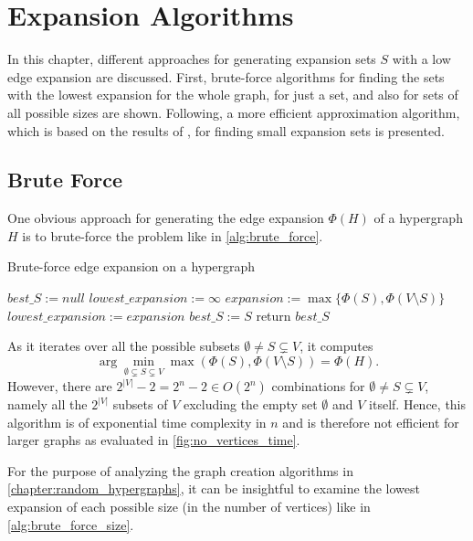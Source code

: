 \chapter{Expansion Algorithms}\label{chapter:algorithms}
In this chapter, different approaches for generating expansion sets $S$ with a low edge expansion are discussed. First, brute-force algorithms for finding the sets with the lowest expansion for the whole graph, %
for just a set,  %
and also for sets of all possible sizes  %
are shown. Following, a more efficient approximation algorithm, which is based on the results of \cite{ChanLTZ16}, for finding small expansion sets is presented.
\section{Brute Force}
One obvious approach for generating the edge expansion $\Phi(H)$ of a hypergraph $H$ is to brute-force the problem like in \cref{alg:brute_force}.
\begin{algorithm}[H]
	\caption{Brute-force edge expansion on a hypergraph \label{alg:brute_force}}
	\begin{algorithmic}
		\State $best\_S := null$
		\State $lowest\_expansion := \infty$
		\State $expansion :=  \max\{ \Phi(S), \Phi({V\setminus S})\}$
			\State $lowest\_expansion := expansion$
			\State $best\_S := S$
		\EndIf
		\EndFor	
		\State return $best\_S$
		\EndFunction
	\end{algorithmic}
\end{algorithm}
As it iterates over all the possible subsets $\emptyset \neq S \subsetneq V$, it computes \begin{equation}
\arg\min_{\emptyset \subsetneq S \subsetneq V} \max{( \Phi(S), \Phi({V\setminus S}))} = \Phi(H).
\end{equation}
However, there are $2^{|V|}-2 = 2^{n}-2 \in O(2^n) $ combinations for $\emptyset \neq S \subsetneq V$, namely all the $2^{|V|}$ subsets of $V$ excluding the empty set $\emptyset$ and $V$ itself. Hence, this algorithm is of exponential time complexity in $n$ and is therefore not efficient for larger graphs as evaluated in \cref{fig:no_vertices_time}.

For the purpose of analyzing the graph creation algorithms in \cref{chapter:random_hypergraphs}, it can be insightful to examine the lowest expansion of each possible size (in the number of vertices) like in \cref{alg:brute_force_size}.

